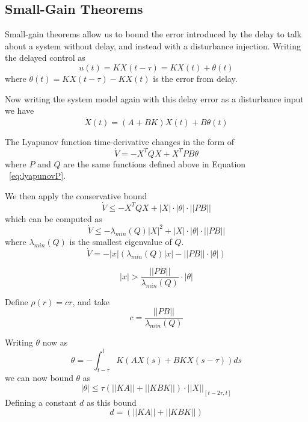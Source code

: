 \documentclass[conference]{IEEEtran}
\begin{document}
\subsection{Small-Gain Theorems}

Small-gain theorems allow us to bound the error introduced by the delay to talk about a system without delay, and instead with a disturbance injection.  Writing the delayed control as 
\begin{equation}
u\left(t\right)=KX\left(t-\tau\right)=KX\left(t\right)+\theta\left(t\right)
\end{equation} where $\theta\left(t\right)=KX\left(t-\tau\right)-KX\left(t\right)$ is the error from delay.

Now writing the system model again with this delay error as a disturbance input we have 
\begin{equation}
\dot{X}\left(t\right)=\left(A+BK\right)X\left(t\right)+B\theta\left(t\right)
\end{equation}

The Lyapunov function time-derivative changes in the form of 
\begin{equation}
\dot{V}=-X^TQX+X^TPB\theta
\end{equation} where $P$ and $Q$ are the same functions defined above in Equation ~\ref{eq:lyapunovP}.

We then apply the conservative bound 
\begin{equation}
\dot{V}\leq-X^TQX+|X|\cdot|\theta|\cdot||PB||
\end{equation}
which can be computed as
\begin{equation}
\dot{V}\leq-\lambda_{min}\left(Q\right)|X|^2+|X|\cdot|\theta|\cdot||PB||
\label{eq:smallGainConservativeBound}
\end{equation} where $\lambda_{min}\left(Q\right)$ is the smallest eigenvalue of $Q$.
\begin{equation}
\dot{V}=-|x|\left(\lambda_{min}\left(Q\right)|x|-||PB||\cdot|\theta|\right)
\end{equation}

\begin{equation}
|x|>\frac{||PB||}{\lambda_{min}\left(Q\right)}\cdot|\theta|
\end{equation}

Define $\rho\left(r\right)=cr$, and take 
\begin{equation}
c=\frac{||PB||}{\lambda_{min}\left(Q\right)}
\end{equation}

Writing $\theta$ now as 
\begin{equation}
\theta=-\int^{t}_{t-\tau}K\left(AX\left(s\right)+BKX\left(s-\tau\right)\right)ds
\end{equation} we can now bound $\theta$ as 
\begin{equation}
|\theta|\leq\tau\left(||KA||+||KBK||\right)\cdot||X||_{\left[t-2\tau,t\right]}
\end{equation}
Defining a constant $d$ as this bound 
\begin{equation}
d=(||KA||+||KBK||)
\end{equation} 
\end{document}

